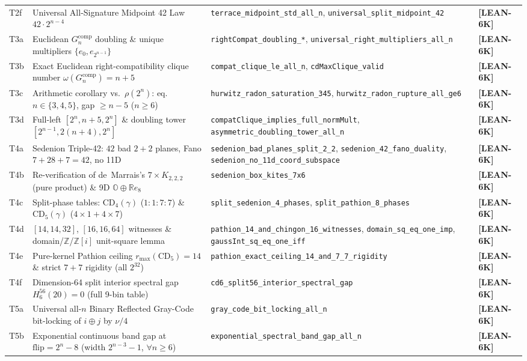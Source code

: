 \documentclass[11pt,reqno]{amsart}
\newcommand{\code}[1]{\textnormal{\texttt{\small\nolinkurl{#1}}}}
\theoremstyle{plain}
\theoremstyle{definition}
\theoremstyle{remark}
\newcommand{\tagLean}{\mbox{\textsf{\textbf{\color{oiBlue}[LEAN-6K]}}}}
\newcommand{\CD}{\mathrm{CD}}
\newcommand{\R}{\mathbb{R}}
\newcommand{\OO}{\mathbb{O}}
\newcommand{\Z}{\mathbb{Z}}
\newcommand{\comp}{\mathrm{comp}}
\newcommand{\flip}{\mathrm{flip}}
\begin{document}
\begin{table}[htbp]
\begin{tabularx}{\textwidth}{@{}l >{\raggedright\arraybackslash}p{6.0cm} >{\raggedright\arraybackslash}X l@{}}
T2f & Universal All-Signature Midpoint 42 Law $42\cdot 2^{n-4}$ & \code{terrace_midpoint_std_all_n}, \code{universal_split_midpoint_42} & \tagLean \\
\addlinespace[2pt]
T3a & Euclidean $G_n^{\comp}$ doubling \& unique multipliers $\{e_0,e_{2^{n-1}}\}$ & \code{rightCompat_doubling_*}, \code{universal_right_multipliers_all_n} & \tagLean \\
T3b & Exact Euclidean right-compatibility clique number $\omega(G_n^{\comp})=n+5$ & \code{compat_clique_le_all_n}, \code{cdMaxClique_valid} & \tagLean \\
T3c & Arithmetic corollary vs.\ $\rho(2^n)$: eq.\ $n\in\{3,4,5\}$, gap $\ge n-5$ ($n\ge 6$) & \code{hurwitz_radon_saturation_345}, \code{hurwitz_radon_rupture_all_ge6} & \tagLean \\
T3d & Full-left $[2^n,n+5,2^n]$ \& doubling tower $[2^{n-1},2(n+4),2^n]$ & \code{compatClique_implies_full_normMult}, \code{asymmetric_doubling_tower_all_n} & \tagLean \\
\addlinespace[2pt]
T4a & Sedenion Triple-42: $42$ bad $2+2$ planes, Fano $7+28+7=42$, no 11D & \code{sedenion_bad_planes_split_2_2}, \code{sedenion_42_fano_duality}, \code{sedenion_no_11d_coord_subspace} & \tagLean \\
T4b & Re-verification of de~Marrais's $7\times K_{2,2,2}$ (pure product) \& 9D $\OO\oplus\R e_8$ & \code{sedenion_box_kites_7x6} & \tagLean \\
T4c & Split-phase tables: $\CD_4(\gamma)$ ($1{:}1{:}7{:}7$) \& $\CD_5(\gamma)$ ($4{\times}1{+}4{\times}7$) & \code{split_sedenion_4_phases}, \code{split_pathion_8_phases} & \tagLean \\
T4d & $[14,14,32]$, $[16,16,64]$ witnesses \& domain/$\Z$/$\Z[i]$ unit-square lemma & \code{pathion_14_and_chingon_16_witnesses}, \code{domain_sq_eq_one_imp}, \code{gaussInt_sq_eq_one_iff} & \tagLean \\
T4e & Pure-kernel Pathion ceiling $r_{\max}(\CD_5)=14$ \& strict $7+7$ rigidity (all $2^{32}$) & \code{pathion_exact_ceiling_14_and_7_7_rigidity} & \tagLean \\
T4f & Dimension-64 split interior spectral gap $H_6^{56}(20)=0$ (full 9-bin table) & \code{cd6_split56_interior_spectral_gap} & \tagLean \\
\addlinespace[2pt]
T5a & Universal all-$n$ Binary Reflected Gray-Code bit-locking of $i \oplus j$ by $\nu/4$ & \code{gray_code_bit_locking_all_n} & \tagLean \\
T5b & Exponential continuous band gap at $\flip = 2^n - 8$ (width $2^{n-3}-1$, $\forall n \ge 6$) & \code{exponential_spectral_band_gap_all_n} & \tagLean \\

\end{tabularx}
\end{table}
\end{document}
